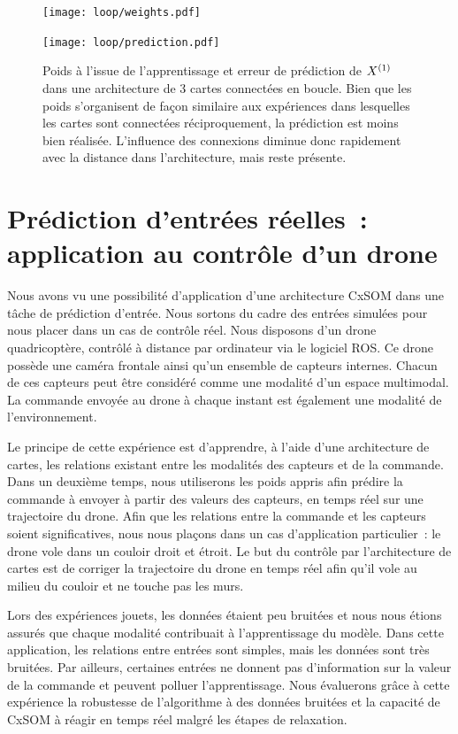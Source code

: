 \documentclass[../main]{subfiles}
\begin{document}
\begin{figure}[h!]
	\begin{minipage}{\textwidth}
		\centering\texttt{[image: loop/weights.pdf]}
	\end{minipage}
	\begin{minipage}{\textwidth}
		\centering\texttt{[image: loop/prediction.pdf]}
		\caption{Poids à l'issue de l'apprentissage et erreur de prédiction de $X^{({1})}$ dans une architecture de 3 cartes connectées en boucle. Bien que les poids s'organisent de façon similaire aux expériences dans lesquelles les cartes sont connectées réciproquement, la prédiction est moins bien réalisée. L'influence des connexions diminue donc rapidement avec la distance dans l'architecture, mais reste présente.\label{fig:3som_loop}}
	\end{minipage}
\end{figure}

\section{Prédiction d'entrées réelles~: application au contrôle d'un drone}

Nous avons vu une possibilité d'application d'une architecture CxSOM dans une tâche de prédiction d'entrée. Nous sortons du cadre des entrées simulées pour nous placer dans un cas de contrôle réel. 
Nous disposons d'un drone quadricoptère, contrôlé à distance par ordinateur via le logiciel ROS.
Ce drone possède une caméra frontale ainsi qu'un ensemble de capteurs internes. Chacun de ces capteurs peut être considéré comme une modalité d'un espace multimodal. 
La commande envoyée au drone à chaque instant est également une modalité de l'environnement.

Le principe de cette expérience est d'apprendre, à l'aide d'une architecture de cartes, les relations existant entre les modalités des capteurs et de la commande. Dans un deuxième temps, nous utiliserons les poids appris afin prédire la commande à envoyer à partir des valeurs des capteurs, en temps réel sur une trajectoire du drone.
Afin que les relations entre la commande et les capteurs soient significatives, nous nous plaçons dans un cas d'application particulier~: le drone vole dans un couloir droit et étroit. Le but du contrôle par l'architecture de cartes est de corriger la trajectoire du drone en temps réel afin qu'il vole au milieu du couloir et ne touche pas les murs.

Lors des expériences jouets, les données étaient peu bruitées et nous nous étions assurés que chaque modalité contribuait à l'apprentissage du modèle. 
Dans cette application, les relations entre entrées sont simples, mais les données sont très bruitées. Par ailleurs, certaines entrées ne donnent pas d'information sur la valeur de la commande et peuvent polluer l'apprentissage.
Nous évaluerons grâce à cette expérience la robustesse de l'algorithme à des données bruitées et la capacité de CxSOM à réagir en temps réel malgré les étapes de relaxation.
\end{document}
